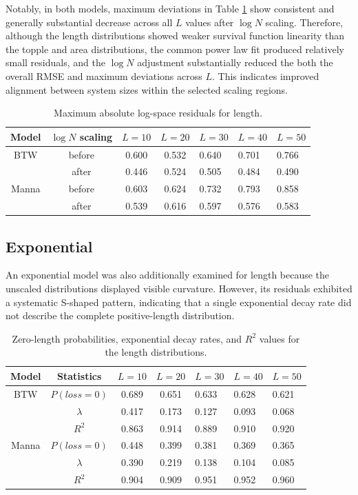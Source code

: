 Notably, in both models, maximum deviations in Table  \ref{tab:length-maxdev-powerlaw}  show consistent and generally substantial decrease across all $L$ values after $\log N$ scaling.  Therefore, although the length distributions showed weaker survival function linearity than the topple and area distributions, the common power law fit produced relatively small residuals, and the $\log N$ adjustment substantially reduced the both the overall RMSE and maximum deviations across $L$. This indicates improved alignment between system sizes within the selected scaling regions. 

\begin{table}[htbp]
    \centering
    \begin{tabular}{cccclll}\toprule
         Model&  $\log N$ scaling&  $L=10$&  $L=20$& $L=30$& $L=40$& $L=50$\\\midrule
         BTW&  before&  0.600&  0.532& 0.640& 0.701& 0.766\\
         &  after&  0.446&  0.524& 0.505& 0.484& 0.490\\
         Manna&  before&  0.603&  0.624& 0.732& 0.793& 0.858\\
         &  after&  0.539&  0.616& 0.597& 0.576& 0.583\\ \bottomrule
    \end{tabular}
    \caption{Maximum absolute log-space residuals for length.}
    \label{tab:length-maxdev-powerlaw}
\end{table}

\subsection{Exponential}\label{subsec:lengthexp}

An exponential model was also additionally examined for length because the unscaled distributions displayed visible curvature. However, its residuals exhibited a systematic S-shaped pattern, indicating that a single exponential decay rate did not describe the complete positive-length distribution.\\

\begin{table}[htbp]
    \centering
    \begin{tabular}{cccclll}\toprule
         Model&  Statistics&  $L=10$&  $L=20$& $L=30$& $L=40$& $L=50$\\\midrule
         BTW&  $P(loss=0)$&  0.689&  0.651& 0.633& 0.628& 0.621\\
         &  $\lambda$&  0.417&  0.173& 0.127& 0.093& 0.068\\
 & $R^2$& 0.863& 0.914& 0.889& 0.910&0.920\\
         Manna&  $P(loss=0)$&  0.448&  0.399& 0.381& 0.369& 0.365\\
 & $\lambda$& 0.390& 0.219& 0.138& 0.104&0.085\\
         &  $R^2$&  0.904&  0.909& 0.951& 0.952& 0.960\\ \bottomrule
    \end{tabular}
    \caption{Zero-length probabilities, exponential decay rates, and $R^2$ values for the length distributions.}
    \label{tab:length-summary-exp}
\end{table}

